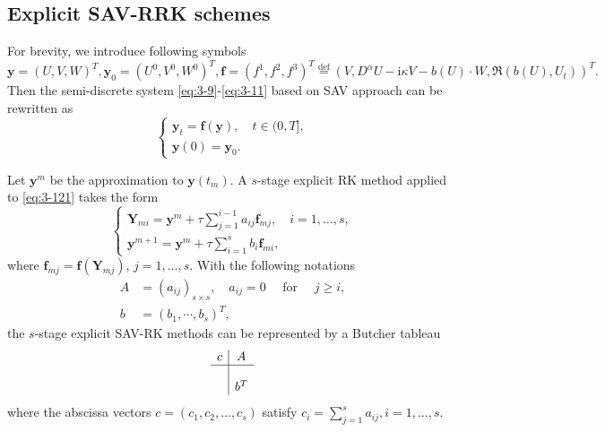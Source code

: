 \documentclass[preprint,compress,3p,10pt,fleqn]{elsarticle}
\numberwithin{equation}{section}
\begin{document}
\subsection{Explicit SAV-RRK schemes}
For brevity, we introduce following symbols
\begin{equation}
\bm{y}=\left(U,V,W\right)^T,\bm{y}_0=\left(U^0,V^0,W^0\right)^T , \bm{f}=(f^1,f^2,f^3)^T\overset{\text{def}}{=}(V,D^{\alpha} U-\mathrm{i}\kappa V-b(U)\cdot W,\Re\left(b(U), U_t\right))^T.
\end{equation}
Then the semi-discrete system \eqref{eq:3-9}-\eqref{eq:3-11} based on SAV approach can be rewritten as
\begin{equation}
\left\{\begin{array}{l}
\bm{y}_t=\bm{f}(\bm{y}),\quad t \in(0, T],\\
\bm{y}(0)=\bm{y}_0.
\end{array}\right.\label{eq:3-121}
\end{equation}
	
Let $\bm{y}^m$  be the approximation to $\bm{y}\left(t_m\right)$. A $s$-stage explicit RK method \cite{hairerRungeKuttaMethods2015} applied to \eqref{eq:3-121} takes the form
\begin{equation}
\left\{\begin{array}{l}
\bm{Y}_{m i}=\bm{y}^m+\tau \sum\limits_{j=1}^{i-1} a_{i j} \bm{f}_{m j}, \quad i=1, \ldots, s, \\
\bm{y}^{m+1}=\bm{y}^m+\tau \sum\limits_{i=1}^s b_i \bm{f}_{m i},
\end{array}\right.\label{eq:4-31}
\end{equation}
where $\bm{f}_{m j}=\bm{f}\left(\bm{Y}_{m j}\right)$, $j=1, \ldots, s$. With the following notations
\begin{equation}
\begin{aligned}
A & =\left(a_{i j}\right)_{s \times s}, \quad a_{i j}=0 \quad \text { for } \quad j \geq i, \\
b & =\left(b_1, \cdots, b_s\right)^T,
\end{aligned}
\end{equation}
the $s$-stage explicit SAV-RK methods can be represented by a Butcher tableau
\begin{equation}
\begin{array}{c|c}
c & A \\
\hline \\
& b^T
\end{array}
\end{equation}
where the abscissa vectors $c=(c_1,c_2,\dots,c_s)$ satisfy $c_i=\sum\limits_{j=1}^s a_{i j}, i=1, \ldots, s$.
	
\end{document}
